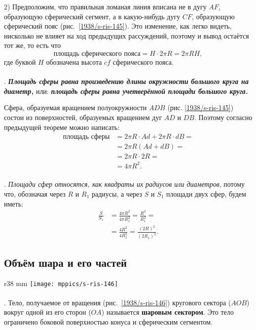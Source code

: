 2) Предположим, что правильная ломаная линия вписана не в дугу $AF$, образующую сферический сегмент, а в какую-нибудь дугу $CF$, образующую сферический пояс (рис.~\ref{1938/s-ris-145}).
Это изменение, как легко видеть, нисколько не влияет на ход предыдущих рассуждений, поэтому и вывод остаётся тот же, то есть что
\[\text{площадь сферического пояса} = H \cdot 2\pi R = 2\pi RH,\]
где буквой $H$ обозначена высота $cf$ сферического пояса.

\paragraph{}\label{1938/s138}
.
\textbf{\emph{Площадь сферы равна произведению длины окружности большого круга на диаметр,}} или: \textbf{\emph{площадь сферы равна учетверённой площади большого круга.}}

Сфера, образуемая вращением полуокружности $ADB$ (рис. \ref{1938/s-ris-145}) состои из поверхностей, образуемых вращением дуг $AD$ и $DB$.
Поэтому согласно предыдущей теореме можно написать:
\begin{align*}
\text{площадь сферы} &= 2\pi R\cdot Ad + 2\pi R\cdot dB =
\\
&=2\pi R(Ad + dB) =
\\
&= 2\pi R\cdot 2R = 
\\
&=4\pi R^2.
\end{align*}

\paragraph{}\label{1938/s139}
.
\emph{Площади сфер относятся, как квадраты их радиусов или диаметров}, потому что, обозначая через $R$ и $R_1$ радиусы, а через $S$ и $S_1$ площади двух сфер, будем иметь:
\begin{align*}
\frac{S}{S_1} &= \frac{4\pi R^2}{4\pi R^2_1} =\frac{R^2}{R^2_1} = 
\\&=\frac{4R^2}{4R_1^2} =\frac{(2R)^2}{(2R_1)^2}.
\end{align*}

\subsection*{Объём шара и его частей}

{

\begin{wrapfigure}{r}{38 mm}
\vskip-10mm
\centering
\texttt{[image: mppics/s-ris-146]}
\caption{}\label{1938/s-ris-146}
\vskip-0mm
\end{wrapfigure}

\paragraph{}\label{1938/s140}
\mbox{.}
Тело, получаемое от вращения (рис.~\ref{1938/s-ris-146}) кругового сектора ($AOB$) вокруг одной из его сторон ($OA$) называется \textbf{шаровым сектором}.
Это тело ограничено боковой поверхностью конуса и сферическим сегментом.

}

